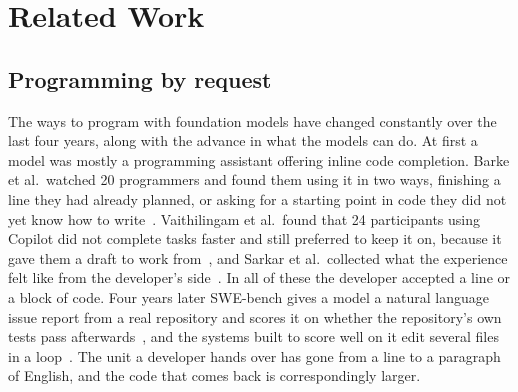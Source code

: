 \section{Related Work}
\label{sec:related}

\subsection{Programming by request}

The ways to program with foundation models have changed constantly over the last
four years, along with the advance in what the models can do. At first a model was
mostly a programming assistant offering inline code completion. Barke et al.\
watched 20 programmers and found them using it in two ways, finishing a line they
had already planned, or asking for a starting point in code they did not yet know
how to write~\cite{barke2023}. Vaithilingam et al.\ found that 24 participants
using Copilot did not complete tasks faster and still preferred to keep it on,
because it gave them a draft to work from~\cite{vaithilingam2022}, and Sarkar et
al.\ collected what the experience felt like from the developer's
side~\cite{sarkar2022}. In all of these the developer accepted a line or a block
of code. Four years later SWE-bench gives a model a natural language issue report
from a real repository and scores it on whether the repository's own tests pass
afterwards~\cite{jimenez2024}, and the systems built to score well on it edit
several files in a loop~\cite{yang2024}. The unit a developer hands over has gone
from a line to a paragraph of English, and the code that comes back is
correspondingly larger.

